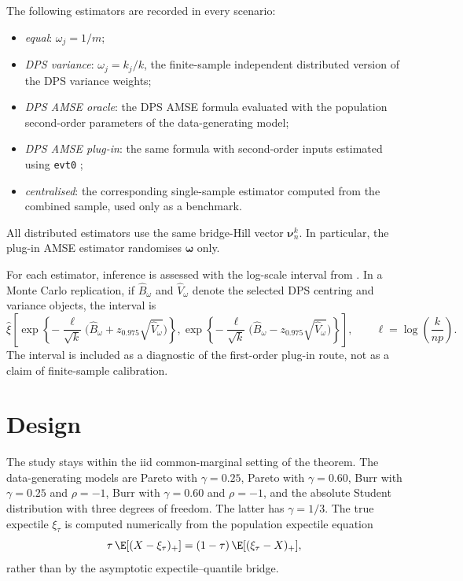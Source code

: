 The following estimators are recorded in every scenario:
\begin{itemize}
\item \emph{equal}: \(\omega_j=1/m\);
\item \emph{DPS variance}: \(\omega_j=k_j/k\), the finite-sample independent
      distributed version of the DPS variance weights;
\item \emph{DPS AMSE oracle}: the DPS AMSE formula evaluated with the
      population second-order parameters of the data-generating model;
\item \emph{DPS AMSE plug-in}: the same formula with second-order inputs
      estimated using \texttt{evt0} \parencite{evt0R};
\item \emph{centralised}: the corresponding single-sample estimator computed
      from the combined sample, used only as a benchmark.
\end{itemize}
All distributed estimators use the same bridge-Hill vector
\(\bm\nu_n^k\). In particular, the plug-in AMSE estimator randomises
\(\bm\omega\) only.

For each estimator, inference is assessed with the log-scale interval from
. In a Monte Carlo replication, if
\(\widehat B_\omega\) and \(\widehat V_\omega\) denote the selected DPS
centring and variance objects, the interval is
\[
  \widehat\xi
  \left[
    \exp\!\left\{-\frac{\ell}{\sqrt{k}}
      \big(\widehat B_\omega+z_{0.975}\sqrt{\widehat V_\omega}\big)\right\},
    \exp\!\left\{-\frac{\ell}{\sqrt{k}}
      \big(\widehat B_\omega-z_{0.975}\sqrt{\widehat V_\omega}\big)\right\}
  \right],
  \qquad
  \ell=\log\!\left(\frac{k}{np}\right).
\]
The interval is included as a diagnostic of the first-order plug-in route,
not as a claim of finite-sample calibration.

\section{Design}
\label{sec:sim:design}

The study stays within the iid common-marginal setting of the theorem. The
data-generating models are Pareto with \(\gamma=0.25\), Pareto with
\(\gamma=0.60\), Burr with \(\gamma=0.25\) and \(\rho=-1\), Burr with
\(\gamma=0.60\) and \(\rho=-1\), and the absolute Student distribution with
three degrees of freedom. The latter has \(\gamma=1/3\). The true expectile
\(\xi_\tau\) is computed numerically from the population expectile equation
\[
  \tau\,\E[(X-\xi_\tau)_+]
  =
  (1-\tau)\,\E[(\xi_\tau-X)_+],
\]
rather than by the asymptotic expectile--quantile bridge.

